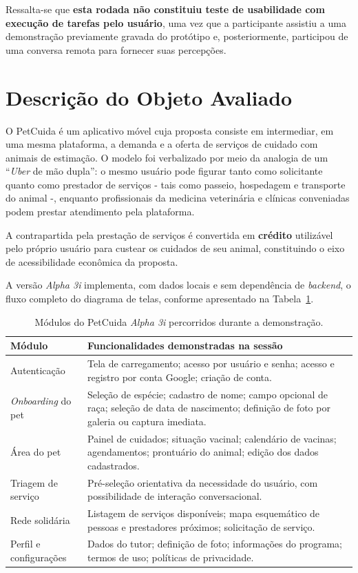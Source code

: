 \documentclass[12pt,a4paper]{article}
\begin{document}
Ressalta-se que \textbf{esta rodada não constituiu teste de usabilidade com execução de
tarefas pelo usuário}, uma vez que a participante assistiu a uma demonstração previamente
gravada do protótipo e, posteriormente, participou de uma conversa remota para fornecer
suas percepções.

\section{Descrição do Objeto Avaliado}

O PetCuida é um aplicativo móvel cuja proposta consiste em intermediar, em uma mesma
plataforma, a demanda e a oferta de serviços de cuidado com animais de estimação. O modelo
foi verbalizado por meio da analogia de um \enquote{\textit{Uber} de mão dupla}: o mesmo
usuário pode figurar tanto como solicitante quanto como prestador de serviços - tais como
passeio, hospedagem e transporte do animal -, enquanto profissionais da medicina
veterinária e clínicas conveniadas podem prestar atendimento pela plataforma.

A contrapartida pela prestação de serviços é convertida em \textbf{crédito} utilizável pelo
próprio usuário para custear os cuidados de seu animal, constituindo o eixo de acessibilidade
econômica da proposta.

A versão \textit{Alpha 3i} implementa, com dados locais e sem dependência de
\textit{backend}, o fluxo completo do diagrama de telas, conforme apresentado na
Tabela~\ref{tab:modulos}.

\begin{table}[h!]
\centering
\small
\begin{tabular}{@{}>{\raggedright\arraybackslash}p{4.2cm}>{\raggedright\arraybackslash}p{9.5cm}@{}}
\toprule
\textbf{Módulo} & \textbf{Funcionalidades demonstradas na sessão} \\
\midrule
Autenticação & Tela de carregamento; acesso por usuário e senha; acesso e registro por conta Google; criação de conta. \\
\textit{Onboarding} do pet & Seleção de espécie; cadastro de nome; campo opcional de raça; seleção de data de nascimento; definição de foto por galeria ou captura imediata. \\
Área do pet & Painel de cuidados; situação vacinal; calendário de vacinas; agendamentos; prontuário do animal; edição dos dados cadastrados. \\
Triagem de serviço & Pré-seleção orientativa da necessidade do usuário, com possibilidade de interação conversacional. \\
Rede solidária & Listagem de serviços disponíveis; mapa esquemático de pessoas e prestadores próximos; solicitação de serviço. \\
Perfil e configurações & Dados do tutor; definição de foto; informações do programa; termos de uso; políticas de privacidade. \\
\bottomrule
\end{tabular}
\caption{Módulos do PetCuida \textit{Alpha 3i} percorridos durante a demonstração.}
\label{tab:modulos}
\end{table}
\end{document}
